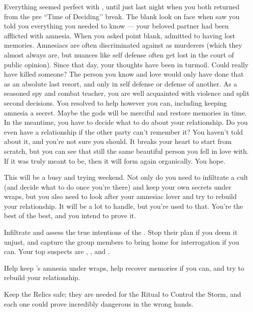 \documentclass[char]{GL2020}
\begin{document}
Everything seemed perfect with \cLibrarian{}, until just last night when you both returned from the pre ``Time of Deciding’’ break. The blank look on \cLibrarian{\their} face when \cLibrarian{\they} saw you told you everything you needed to know — your beloved partner had been afflicted with amnesia. When you asked \cLibrarian{\them} point blank, \cLibrarian{\they} admitted to having lost \cLibrarian{\their} memories. Amnesiacs are often discriminated against as murderers (which they almost always are, but nuances like self defense often get lost in the court of public opinion). Since that day, your thoughts have been in turmoil. Could \cLibrarian{} really have killed someone? The person you know and love would only have done that as an absolute last resort, and only in self defense or defense of another. As a seasoned spy and combat teacher, you are well acquainted with violence and split second decisions. You resolved to help \cLibrarian{} however you can, including keeping \cLibrarian{\their} amnesia a secret. Maybe the gods will be merciful and restore \cLibrarian{\their} memories in time. In the meantime, you have to decide what to do about your relationship. Do you even have a relationship if the other party can't remember it? You haven't told \cLibrarian{\them} about it, and you're not sure you should. It breaks your heart to start from scratch, but you can see that \cLibrarian{\theyare} still the same beautiful person you fell in love with. If it was truly meant to be, then it will form again organically. You hope. 

This will be a busy and trying weekend. Not only do you need to infiltrate a cult (and decide what to do once you're there) and keep your own secrets under wraps, but you also need to look after your amnesiac lover and try to rebuild your relationship. It will be a lot to handle, but you're used to that. You're the best of the best, and you intend to prove it.

\begin{itemz}
    \item Infiltrate and assess the true intentions of the \pGoaties{}. Stop their plan if you deem it unjust, and capture the group members to bring home for interrogation if you can. Your top suspects are \cChupInventor{}, \cHistory{}, and \cPirate{}.
    \item Help keep \cLibrarian{}'s amnesia under wraps, help \cLibrarian{\them} recover \cLibrarian{\their} memories if you can, and try to rebuild your relationship.
    \item Keep the Relics safe; they are needed for the Ritual to Control the Storm, and each one could prove incredibly dangerous in the wrong hands.
\end{itemz}
\end{document}
